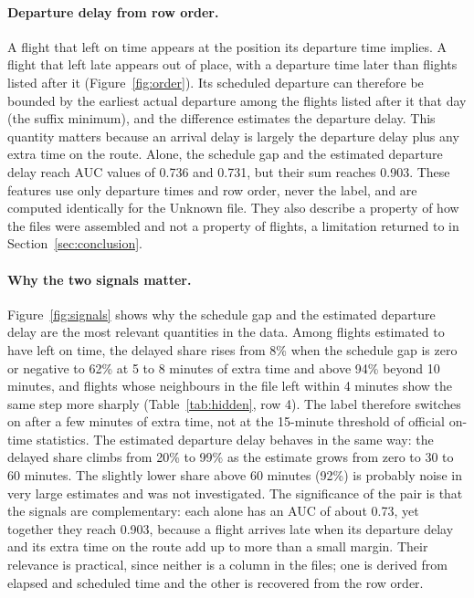 \documentclass[12pt,a4paper]{article}
\begin{document}
\paragraph{Departure delay from row order.} A flight that left on time appears at the position its departure time implies. A flight that left late appears out of place, with a departure time later than flights listed after it (Figure~\ref{fig:order}). Its scheduled departure can therefore be bounded by the earliest actual departure among the flights listed after it that day (the suffix minimum), and the difference estimates the departure delay. This quantity matters because an arrival delay is largely the departure delay plus any extra time on the route. Alone, the schedule gap and the estimated departure delay reach AUC values of 0.736 and 0.731, but their sum reaches 0.903. These features use only departure times and row order, never the label, and are computed identically for the Unknown file. They also describe a property of how the files were assembled and not a property of flights, a limitation returned to in Section~\ref{sec:conclusion}.


\paragraph{Why the two signals matter.} Figure~\ref{fig:signals} shows why the schedule gap and the estimated departure delay are the most relevant quantities in the data. Among flights estimated to have left on time, the delayed share rises from 8\% when the schedule gap is zero or negative to 62\% at 5 to 8 minutes of extra time and above 94\% beyond 10 minutes, and flights whose neighbours in the file left within 4 minutes show the same step more sharply (Table~\ref{tab:hidden}, row 4). The label therefore switches on after a few minutes of extra time, not at the 15-minute threshold of official on-time statistics. The estimated departure delay behaves in the same way: the delayed share climbs from 20\% to 99\% as the estimate grows from zero to 30 to 60 minutes. The slightly lower share above 60 minutes (92\%) is probably noise in very large estimates and was not investigated. The significance of the pair is that the signals are complementary: each alone has an AUC of about 0.73, yet together they reach 0.903, because a flight arrives late when its departure delay and its extra time on the route add up to more than a small margin. Their relevance is practical, since neither is a column in the files; one is derived from elapsed and scheduled time and the other is recovered from the row order.
\end{document}
